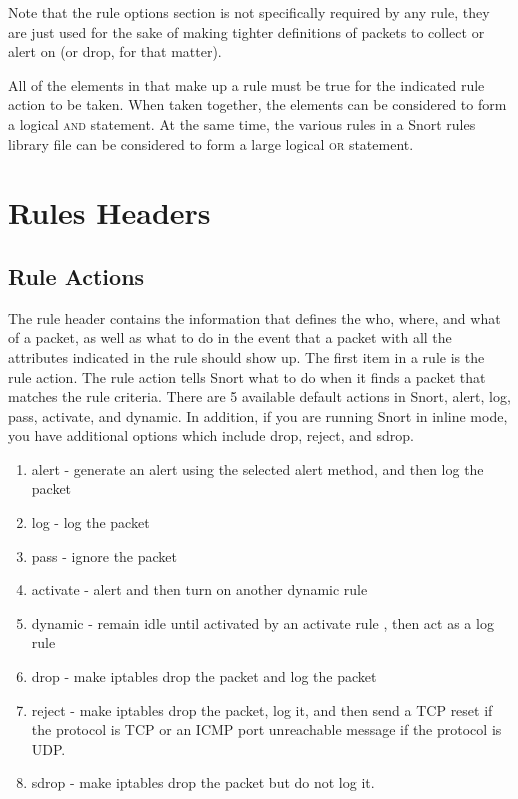 \documentclass[english]{report}
\newenvironment{note}{
\samepage
    \vspace{10pt}{\textsf{
        {\hspace{7pt}\Huge{$\triangle$\hspace{-12.5pt}{\Large{$^!$}}}}\hspace{5pt}
        {\Large{NOTE}}
    }
    }
   \begin{center}
    \par\vspace{-17pt}

    \begin{lrbox}{\savepar}
    \begin{minipage}[r]{6in}
}
{
    \end{minipage}
    \end{lrbox}
    \fbox{
        \usebox{
            \savepar
	}
    }
    \par\vskip10pt
    \end{center}
}
\newenvironment{note}{
        \begin{rawhtml}
        <p><table border="1"><tr><td><b>
        Note:&nbsp;&nbsp;</b>
        \end{rawhtml}
}{
        \begin{rawhtml}
        </b></td></tr></table></p>
        \end{rawhtml}
}
\begin{document}
\begin{note}

Note that the rule options section is not specifically required by any rule,
they are just used for the sake of making tighter definitions of packets to
collect or alert on (or drop, for that matter). 

\end{note}

All of the elements in that make up a rule must be true for the indicated rule
action to be taken. When taken together, the elements can be considered to form
a logical \textsc{and} statement. At the same time, the various rules in a
Snort rules library file can be considered to form a large logical \textsc{or}
statement. 

\section{Rules Headers}

\subsection{Rule Actions}
\label{rules action section}

The rule header contains the information that defines the who, where, and what
of a packet, as well as what to do in the event that a packet with all the
attributes indicated in the rule should show up. The first item in a rule is
the rule action. The rule action tells Snort what to do when it finds a packet
that matches the rule criteria. There are 5 available default actions in Snort,
alert, log, pass, activate, and dynamic. In addition, if you are running Snort
in inline mode, you have additional options which include drop, reject, and
sdrop. 

\begin{enumerate}

\item alert - generate an alert using the selected alert method, and then
log the packet 

\item log - log the packet 

\item pass - ignore the packet 

\item activate - alert and then turn on another dynamic rule  

\item dynamic - remain idle until activated by an activate rule , then act as a
log rule

\item drop - make iptables drop the packet and log the packet

\item reject - make iptables drop the packet, log it, and then send a TCP reset
if the protocol is TCP or an ICMP port unreachable message if the protocol is
UDP.

\item sdrop - make iptables drop the packet but do not log it.

\end{enumerate}
\end{document}
